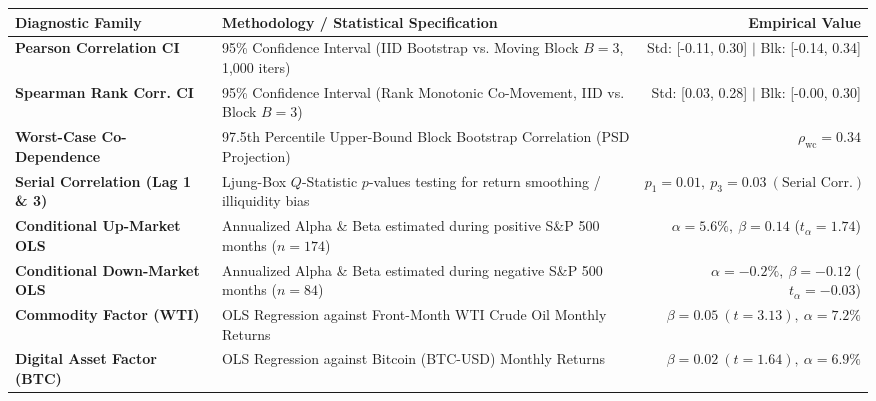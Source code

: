 \documentclass[10pt,a4paper]{article}
\begin{document}
\vspace{0.45em}

\begin{tcolorbox}[colback=white, colframe=primary, title=\textbf{\small\strut Appendix A: Extended Statistical, Bootstrap \& Factor Diagnostics}, fonttitle=\sffamily\bfseries\small, arc=5pt, boxrule=0.8pt, toptitle=4pt, bottomtitle=4pt, left=6pt, right=6pt, top=3.5pt, bottom=3.5pt, colbacktitle=primary]
\renewcommand{\arraystretch}{1.22}
\scriptsize
\begin{tabularx}{\textwidth}{l X r}
\toprule
\textbf{\textcolor{primary}{Diagnostic Family}} & \textbf{\textcolor{primary}{Methodology / Statistical Specification}} & \textbf{\textcolor{primary}{Empirical Value}} \\
\midrule
\textbf{Pearson Correlation CI} & 95\% Confidence Interval (IID Bootstrap vs. Moving Block $B=3$, 1,000 iters) & Std: [-0.11, 0.30] $\vert$ Blk: [-0.14, 0.34] \\
\rowcolor{cardbg} \textbf{Spearman Rank Corr. CI} & 95\% Confidence Interval (Rank Monotonic Co-Movement, IID vs. Block $B=3$) & Std: [0.03, 0.28] $\vert$ Blk: [-0.00, 0.30] \\
\textbf{Worst-Case Co-Dependence} & 97.5th Percentile Upper-Bound Block Bootstrap Correlation (PSD Projection) & $\rho_{\text{wc}} = 0.34$ \\
\rowcolor{cardbg} \textbf{Serial Correlation (Lag 1 \& 3)} & Ljung-Box $Q$-Statistic $p$-values testing for return smoothing / illiquidity bias & $p_1=0.01,\ p_3=0.03\ (\text{Serial Corr.})$ \\
\textbf{Conditional Up-Market OLS} & Annualized Alpha \& Beta estimated during positive S\&P 500 months ($n=174$) & $\alpha=5.6\%,\ \beta=0.14$ ($t_\alpha=1.74$) \\
\rowcolor{cardbg} \textbf{Conditional Down-Market OLS} & Annualized Alpha \& Beta estimated during negative S\&P 500 months ($n=84$) & $\alpha=-0.2\%,\ \beta=-0.12$ ($t_\alpha=-0.03$) \\
\textbf{Commodity Factor (WTI)} & OLS Regression against Front-Month WTI Crude Oil Monthly Returns & $\beta=0.05\ (t=3.13),\ \alpha=7.2\%$ \\
\rowcolor{cardbg} \textbf{Digital Asset Factor (BTC)} & OLS Regression against Bitcoin (BTC-USD) Monthly Returns & $\beta=0.02\ (t=1.64),\ \alpha=6.9\%$ \\
\bottomrule
\end{tabularx}
\end{tcolorbox}
\end{document}
